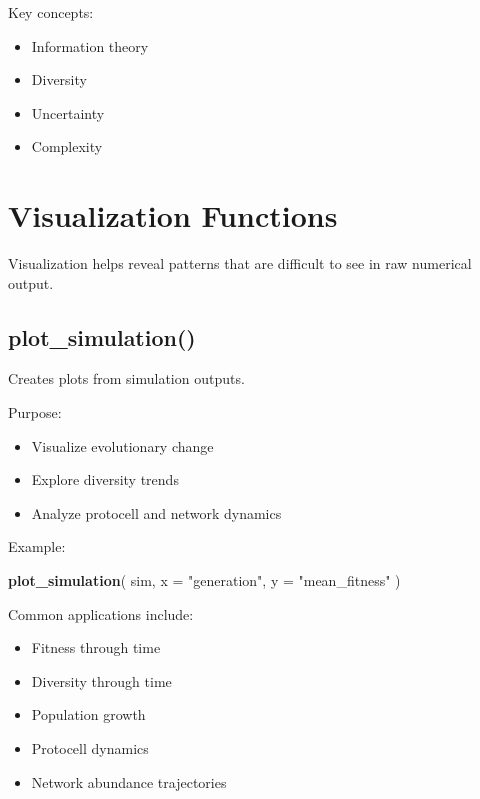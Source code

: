 \documentclass[
  oneside,
  openany]{book}
\newenvironment{Shaded}{\begin{snugshade}}{\end{snugshade}}
\newcommand{\AttributeTok}[1]{\textcolor[rgb]{0.13,0.29,0.53}{#1}}
\newcommand{\FunctionTok}[1]{\textcolor[rgb]{0.13,0.29,0.53}{\textbf{#1}}}
\newcommand{\NormalTok}[1]{#1}
\newcommand{\StringTok}[1]{\textcolor[rgb]{0.31,0.60,0.02}{#1}}
\providecommand{\tightlist}{%
  \setlength{\itemsep}{0pt}\setlength{\parskip}{0pt}}
\begin{document}
Key concepts:

\begin{itemize}
\tightlist
\item
  Information theory
\item
  Diversity
\item
  Uncertainty
\item
  Complexity
\end{itemize}

\section{Visualization Functions}\label{visualization-functions}

Visualization helps reveal patterns that are difficult to see in raw numerical output.

\subsection{plot\_simulation()}\label{plot_simulation}

Creates plots from simulation outputs.

Purpose:

\begin{itemize}
\tightlist
\item
  Visualize evolutionary change
\item
  Explore diversity trends
\item
  Analyze protocell and network dynamics
\end{itemize}

Example:

\begin{Shaded}
\begin{Highlighting}[]
\FunctionTok{plot\_simulation}\NormalTok{(}
\NormalTok{  sim,}
  \AttributeTok{x =} \StringTok{"generation"}\NormalTok{,}
  \AttributeTok{y =} \StringTok{"mean\_fitness"}
\NormalTok{)}
\end{Highlighting}
\end{Shaded}

Common applications include:

\begin{itemize}
\tightlist
\item
  Fitness through time
\item
  Diversity through time
\item
  Population growth
\item
  Protocell dynamics
\item
  Network abundance trajectories
\end{itemize}
\end{document}
